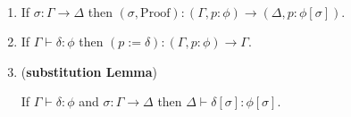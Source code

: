 \begin{code}%
\> \AgdaSymbol{:}  \AgdaSymbol{\{}\AgdaSymbol{\}} \AgdaSymbol{\{}\AgdaSymbol{\}}            \<%
\\
\>     \AgdaSymbol{=}       \AgdaSymbol{\_}    \AgdaSymbol{(}  \AgdaSymbol{)}\<%
\end{code}

\begin{lemma}$ $
\begin{enumerate}
\item
If $\sigma : \Gamma \rightarrow \Delta$ then $(\sigma , \mathrm{Proof}) : (\Gamma , p : \phi) \rightarrow (\Delta , p : \phi [ \sigma ])$.
\item
If $\Gamma \vdash \delta : \phi$ then $(p := \delta) : (\Gamma, p : \phi) \rightarrow \Gamma$.
\item
(\textbf{substitution Lemma})

If $\Gamma \vdash \delta : \phi$ and $\sigma : \Gamma \rightarrow \Delta$ then $\Delta \vdash \delta [ \sigma ] : \phi [ \sigma ]$.
\end{enumerate}
\end{lemma}

\begin{code}%
\> \AgdaSymbol{:}  \AgdaSymbol{\{}\AgdaSymbol{\}} \AgdaSymbol{\{}\AgdaSymbol{\}} \AgdaSymbol{\{}\AgdaSymbol{\}} \<[30]%
\>[30]\<%
\\
\>[0]\<[2]%
\>[2]\AgdaSymbol{\{} \AgdaSymbol{:}  \AgdaSymbol{\}} \AgdaSymbol{\{} \AgdaSymbol{:}  \AgdaSymbol{\}} \AgdaSymbol{\{} \AgdaSymbol{:} \AgdaSymbol{\}}  \<[47]%
\>[47]\<%
\\
\>[0]\<[2]%
\>[2]          \AgdaSymbol{(}  \AgdaSymbol{)}  \AgdaSymbol{(}  \AgdaSymbol{)}\<%
\end{code}

